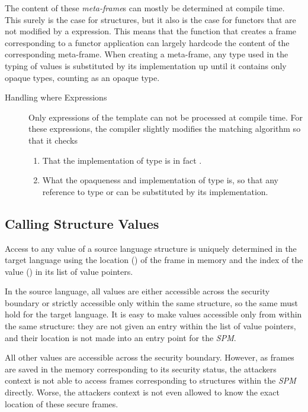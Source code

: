 The content of these \emph{meta-frame}s can mostly be determined at compile time. This surely is the case for structures, but it also is the case for functors that are not modified by a  expression.
This means that the function that creates a frame corresponding to a functor application can largely hardcode the content of the corresponding meta-frame.
When creating a meta-frame, any type used in the typing of values is substituted by its implementation up until it contains only opaque types, counting  as an opaque type.

\begin{description}
\item[Handling where Expressions] 
Only  expressions of the template  can not be processed at compile time.
For these expressions, the compiler slightly modifies the matching algorithm so that it checks
\begin{enumerate}
\item That the implementation of type  is in fact .
\item What the opaqueness and implementation of type  is, so that any reference to type  or  can be substituted by its implementation.
\end{enumerate}
\end{description}
\subsection{Calling Structure Values}
Access to any value of a source language structure is uniquely determined in the target language using the location () of the frame in memory and the index of the value () in its list of value pointers.

In the source language, all values are either accessible across the security boundary or strictly accessible only within the same structure, so the same must hold for the target language.
It is easy to make values accessible only from within the same structure: they are not given an entry within the list of value pointers, and their location is not made into an entry point for the \emph{SPM}.

All other values are accessible across the security boundary. However, as frames are saved in the memory corresponding to its security status, the attackers context is not able to access frames corresponding to structures within the \emph{SPM} directly.
Worse, the attackers context is not even allowed to know the exact location  of these secure frames.

